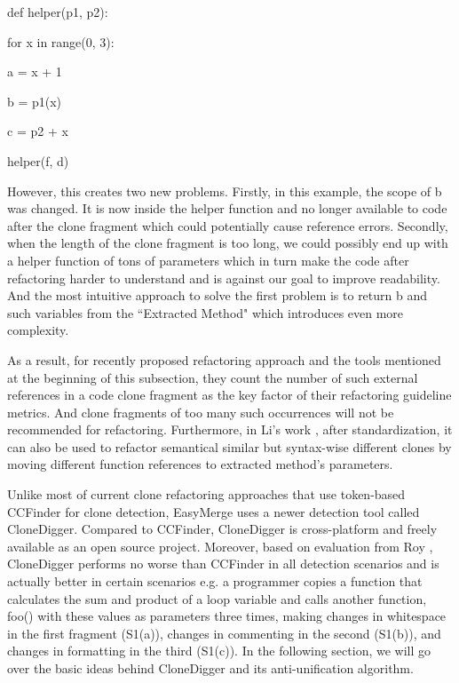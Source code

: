 \documentclass{acm_proc_article-sp}
\begin{document}
\IncMargin{1em}
\begin{algorithm}
	def helper(p1, p2):
	
		\Indp for x in range(0, 3):
		
			\Indp a = x + 1
			
			b = p1(x)
			
			c = p2 + x
			
		\Indm \Indm helper(f, d)
	
\end{algorithm}
\DecMargin{1em}

However, this creates two new problems. Firstly, in this example, the scope of b was changed. It is now inside the helper function and no longer available to code after the clone fragment
which could potentially cause reference errors. Secondly, when the length of the clone fragment is too long, we could possibly end up with a helper function of tons of parameters
which in turn make the code after refactoring harder to understand and is against our goal to improve readability. And the most intuitive approach to solve the first problem
is to return b and such variables from the ``Extracted Method" which introduces even more complexity.

As a result, for recently proposed refactoring approach \cite{li} and the tools mentioned at the beginning of this subsection, they count the number of such external references
in a code clone fragment as the key factor of their refactoring guideline metrics. 
And clone fragments of too many such occurrences will not be recommended for refactoring.
Furthermore, in Li's work \cite{li}, after standardization, it can also be used to refactor semantical
similar but syntax-wise different clones by moving different function references to extracted method's parameters.

Unlike most of current clone refactoring approaches that use token-based CCFinder \cite{kamiya} for clone detection, EasyMerge uses a newer detection tool called CloneDigger.
Compared to CCFinder, CloneDigger is cross-platform and freely available as an open source project. Moreover, based on evaluation from Roy \cite{roy2},
CloneDigger performs no worse than CCFinder in all detection scenarios and is actually better in certain scenarios e.g. a programmer copies a function that calculates the sum
and product of a loop variable and calls another function, foo() with these values as parameters three times, making changes in whitespace in the first fragment (S1(a)), changes
in commenting in the second (S1(b)), and changes in formatting in the third (S1(c)). In the following section, we will go over the basic ideas behind CloneDigger and its anti-unification
algorithm.
\end{document}
